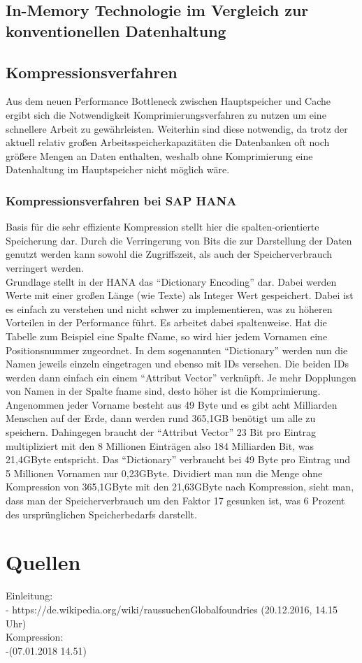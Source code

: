 \documentclass[a4paper, 12pt]{scrartcl}
\begin{document}
\subsection{In-Memory Technologie im Vergleich zur konventionellen Datenhaltung}

\newpage
\subsection{Kompressionsverfahren}
Aus dem neuen Performance Bottleneck zwischen Hauptspeicher und Cache ergibt sich die Notwendigkeit Komprimierungsverfahren zu nutzen um eine  schnellere Arbeit zu gewährleisten. Weiterhin sind diese notwendig, da trotz der aktuell relativ großen Arbeitsspeicherkapazitäten die Datenbanken oft noch größere Mengen an Daten enthalten, weshalb ohne Komprimierung eine Datenhaltung im Hauptspeicher nicht möglich wäre. 
\subsubsection{Kompressionsverfahren bei SAP HANA}
Basis für die sehr effiziente Kompression stellt hier die spalten-orientierte Speicherung dar. Durch die Verringerung von Bits die zur Darstellung der Daten genutzt werden kann sowohl die Zugriffszeit, als auch der Speicherverbrauch verringert werden.\\
Grundlage stellt in der HANA das "`Dictionary Encoding"' dar. Dabei werden Werte mit einer großen Länge (wie Texte) als Integer Wert gespeichert. Dabei ist es einfach zu verstehen und nicht schwer zu implementieren, was zu höheren Vorteilen in der Performance führt. Es arbeitet dabei spaltenweise. Hat die Tabelle zum Beispiel eine Spalte fName, so wird hier jedem Vornamen eine Positionsnummer zugeordnet. In dem sogenannten "`Dictionary"' werden nun die Namen jeweils einzeln eingetragen und ebenso mit IDs versehen. Die beiden IDs werden dann einfach ein einem "`Attribut Vector"' verknüpft. Je mehr Dopplungen von Namen in der Spalte fname sind, desto höher ist die Komprimierung. Angenommen jeder Vorname besteht aus 49 Byte und es gibt acht Milliarden Menschen auf der Erde, dann werden rund 365,1GB benötigt um alle zu speichern. Dahingegen braucht der "`Attribut Vector"' 23 Bit pro Eintrag multipliziert mit den 8 Millionen Einträgen also 184 Milliarden Bit, was 21,4GByte entspricht. Das "`Dictionary"' verbraucht bei 49 Byte pro Eintrag  und 5 Millionen Vornamen nur 0,23GByte. Dividiert man nun die Menge ohne Kompression von 365,1GByte mit den 21,63GByte nach Kompression, sieht man, dass man der Speicherverbrauch um den Faktor 17 gesunken ist, was 6 Prozent des ursprünglichen Speicherbedarfs darstellt.  
\newpage
\section{Quellen}
Einleitung: \\
	- https://de.wikipedia.org/wiki/raussuchenGlobalfoundries (20.12.2016, 14.15 Uhr) \\
Kompression: \\
	-(07.01.2018 14.51) \\
	
	
\end{document}
